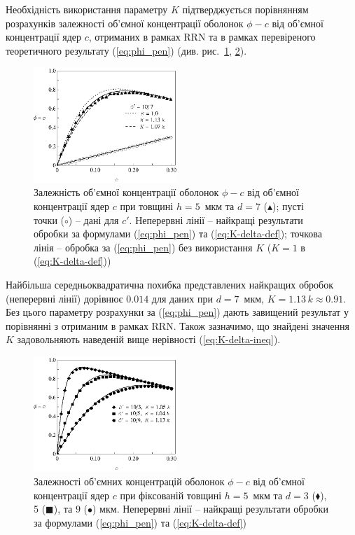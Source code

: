\documentclass[14pt,twoside]{vakthesis}
\begin{document}
Необхідність використання параметру $K$ підтверджується порівнянням розрахунків залежності об'ємної концентрації оболонок $\phi-c$ від об'ємної концентрації ядер $c$, отриманих в рамках RRN \cite{Siekierski2007} та в рамках перевіреного теоретичного результату (\ref{eq:phi_pen}) (див. рис.~\ref{fig:simulations-phi-a}, \ref{fig:simulations-phi-b}).
\begin{figure}[!ht]
	\centering
		\includegraphics[width=0.48\textwidth]{SiekierskiShell_107.eps}
		\caption{Залежність об'ємної концентрації оболонок $\phi-c$ від об'ємної концентрації ядер $c$ \cite{Siekierski2007} при товщині $h=5$~мкм та $d = 7$ ($\blacktriangle$); пусті точки ($\circ$) -- дані для $c'$. Неперервні лінії -- найкращі результати обробки за формулами (\ref{eq:phi_pen}) та (\ref{eq:K-delta-def}); точкова лінія -- обробка за (\ref{eq:phi_pen}) без використання $K$ ($K=1$ в (\ref{eq:K-delta-def}))} \label{fig:simulations-phi-a}
\end{figure}
{\color{violet} Найбільша середньоквадратична 
похибка представлених найкращих обробок (неперервні лінії) 
дорівнює $0.014$ для даних при $d=7$~мкм, $K=1.13\,k \approx 0.91$.} Без цього параметру розрахунки за (\ref{eq:phi_pen}) дають завищений результат у порівнянні з отриманим в рамках RRN.
Також зазначимо, що знайдені значення $K$ задовольняють наведеній 
вище нерівності (\ref{eq:K-delta-ineq}).

\begin{figure}[t]
	\centering
		\includegraphics[width=0.48\textwidth]{SiekierskiShell_103-9.eps}
		\caption{Залежності об'ємних концентрацій оболонок $\phi-c$ від об'ємної концентрації ядер $c$ \cite{Siekierski2007} при фіксованій товщині $h=5$~мкм та  $d = 3$ ($\blacklozenge$), 5 ($\blacksquare$), та $9$ ($\bullet$) мкм. Неперервні лінії -- найкращі результати обробки за формулами (\ref{eq:phi_pen}) та (\ref{eq:K-delta-def})} \label{fig:simulations-phi-b}
\end{figure}
\end{document}
